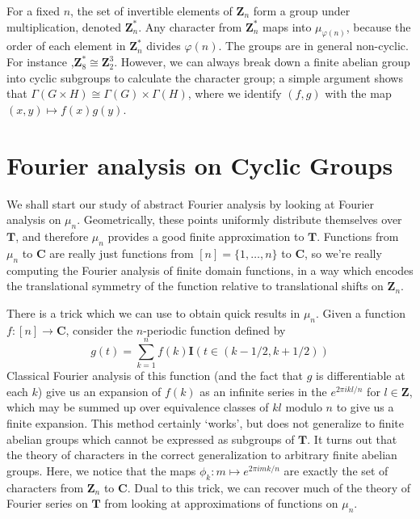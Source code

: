 \begin{example}
    For a fixed $n$, the set of invertible elements of $\mathbf{Z}_n$ form a group under multiplication, denoted $\mathbf{Z}_n^*$. Any character from $\mathbf{Z}_n^*$ maps into $\mu_{\varphi(n)}$, because the order of each element in $\mathbf{Z}_n^*$ divides $\varphi(n)$. The groups are in general non-cyclic. For instance ,$\mathbf{Z}_8^* \cong \mathbf{Z}_2^3$. However, we can always break down a finite abelian group into cyclic subgroups to calculate the character group; a simple argument shows that $\Gamma(G \times H) \cong \Gamma(G) \times \Gamma(H)$, where we identify $(f,g)$ with the map $(x,y) \mapsto f(x)g(y)$.
\end{example}

\section{Fourier analysis on Cyclic Groups}

We shall start our study of abstract Fourier analysis by looking at Fourier analysis on $\mu_n$. Geometrically, these points uniformly distribute themselves over $\mathbf{T}$, and therefore $\mu_n$ provides a good finite approximation to $\mathbf{T}$. Functions from $\mu_n$ to $\mathbf{C}$ are really just functions from $[n] = \{ 1, \dots, n \}$ to $\mathbf{C}$, so we're really computing the Fourier analysis of finite domain functions, in a way which encodes the translational symmetry of the function relative to translational shifts on $\mathbf{Z}_n$.

There is a trick which we can use to obtain quick results in $\mu_n$. Given a function $f: [n] \to \mathbf{C}$, consider the $n$-periodic function defined by
%
\[ g(t) = \sum_{k = 1}^n f(k) \mathbf{I}\left( t \in (k-1/2,k+1/2) \right) \]
%
Classical Fourier analysis of this function (and the fact that $g$ is differentiable at each $k$) give us an expansion of $f(k)$ as an infinite series in the $e^{2\pi i k l/n}$ for $l \in \mathbf{Z}$, which may be summed up over equivalence classes of $kl$ modulo $n$ to give us a finite expansion. This method certainly `works', but does not generalize to finite abelian groups which cannot be expressed as subgroups of $\mathbf{T}$. It turns out that the theory of characters in the correct generalization to arbitrary finite abelian groups. Here, we notice that the maps $\phi_k: m \mapsto e^{2 \pi i mk/n}$ are exactly the set of characters from $\mathbf{Z}_n$ to $\mathbf{C}$. Dual to this trick, we can recover much of the theory of Fourier series on $\mathbf{T}$ from looking at approximations of functions on $\mu_n$.

